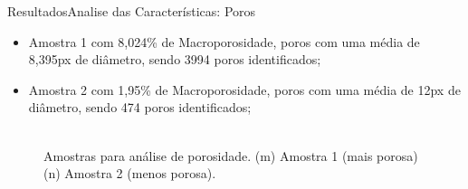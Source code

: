 \documentclass{beamer}
\begin{document}
\begin{frame}{Resultados}{Analise das Características: Poros}
    \begin{itemize}
        \item Amostra 1 com 8,024\% de Macroporosidade, poros com uma média de 8,395px de diâmetro, sendo 3994 poros identificados;
        \item Amostra 2 com 1,95\% de Macroporosidade, poros com uma média de 12px de diâmetro, sendo 474 poros identificados;
    \end{itemize}    
        
    \begin{figure}[!htb]
        \centering
         \hspace*{0.1cm}
        \\
        \scriptsize{Amostras para análise de porosidade. (m) Amostra 1 (mais porosa) (n) Amostra 2 (menos porosa).}
        \end{figure}
    \end{frame}
    
\end{document}
